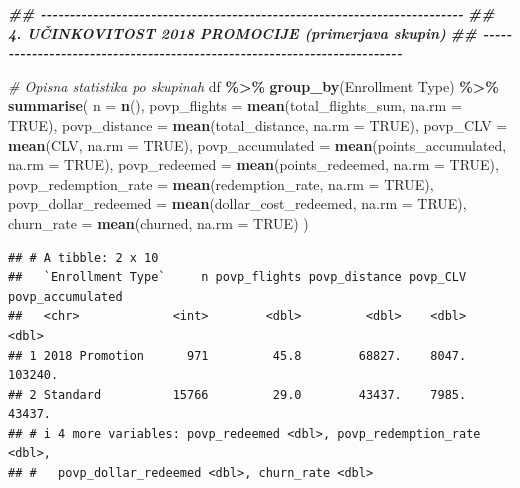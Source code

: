 \documentclass[
]{article}
\newenvironment{Shaded}{\begin{snugshade}}{\end{snugshade}}
\newcommand{\AttributeTok}[1]{\textcolor[rgb]{0.13,0.29,0.53}{#1}}
\newcommand{\CommentTok}[1]{\textcolor[rgb]{0.56,0.35,0.01}{\textit{#1}}}
\newcommand{\ConstantTok}[1]{\textcolor[rgb]{0.56,0.35,0.01}{#1}}
\newcommand{\DocumentationTok}[1]{\textcolor[rgb]{0.56,0.35,0.01}{\textbf{\textit{#1}}}}
\newcommand{\FunctionTok}[1]{\textcolor[rgb]{0.13,0.29,0.53}{\textbf{#1}}}
\newcommand{\NormalTok}[1]{#1}
\newcommand{\SpecialCharTok}[1]{\textcolor[rgb]{0.81,0.36,0.00}{\textbf{#1}}}
\newcommand{\StringTok}[1]{\textcolor[rgb]{0.31,0.60,0.02}{#1}}
\begin{document}
\begin{Shaded}
\begin{Highlighting}[]
\DocumentationTok{\#\# {-}{-}{-}{-}{-}{-}{-}{-}{-}{-}{-}{-}{-}{-}{-}{-}{-}{-}{-}{-}{-}{-}{-}{-}{-}{-}{-}{-}{-}{-}{-}{-}{-}{-}{-}{-}{-}{-}{-}{-}{-}{-}{-}{-}{-}{-}{-}{-}{-}{-}{-}{-}{-}{-}{-}{-}{-}{-}{-}{-}{-}{-}{-}{-}{-}{-}{-}{-}{-}{-}{-}{-}{-}}
\DocumentationTok{\#\# 4. UČINKOVITOST 2018 PROMOCIJE (primerjava skupin)}
\DocumentationTok{\#\# {-}{-}{-}{-}{-}{-}{-}{-}{-}{-}{-}{-}{-}{-}{-}{-}{-}{-}{-}{-}{-}{-}{-}{-}{-}{-}{-}{-}{-}{-}{-}{-}{-}{-}{-}{-}{-}{-}{-}{-}{-}{-}{-}{-}{-}{-}{-}{-}{-}{-}{-}{-}{-}{-}{-}{-}{-}{-}{-}{-}{-}{-}{-}{-}{-}{-}{-}{-}{-}{-}{-}{-}{-}}

\CommentTok{\# Opisna statistika po skupinah}
\NormalTok{df }\SpecialCharTok{\%\textgreater{}\%}
  \FunctionTok{group\_by}\NormalTok{(}\StringTok{\textasciigrave{}}\AttributeTok{Enrollment Type}\StringTok{\textasciigrave{}}\NormalTok{) }\SpecialCharTok{\%\textgreater{}\%}
  \FunctionTok{summarise}\NormalTok{(}
    \AttributeTok{n =} \FunctionTok{n}\NormalTok{(),}
    \AttributeTok{povp\_flights   =} \FunctionTok{mean}\NormalTok{(total\_flights\_sum, }\AttributeTok{na.rm =} \ConstantTok{TRUE}\NormalTok{),}
    \AttributeTok{povp\_distance  =} \FunctionTok{mean}\NormalTok{(total\_distance, }\AttributeTok{na.rm =} \ConstantTok{TRUE}\NormalTok{),}
    \AttributeTok{povp\_CLV       =} \FunctionTok{mean}\NormalTok{(CLV, }\AttributeTok{na.rm =} \ConstantTok{TRUE}\NormalTok{),}
    \AttributeTok{povp\_accumulated =} \FunctionTok{mean}\NormalTok{(points\_accumulated, }\AttributeTok{na.rm =} \ConstantTok{TRUE}\NormalTok{),}
    \AttributeTok{povp\_redeemed     =} \FunctionTok{mean}\NormalTok{(points\_redeemed, }\AttributeTok{na.rm =} \ConstantTok{TRUE}\NormalTok{),}
    \AttributeTok{povp\_redemption\_rate =} \FunctionTok{mean}\NormalTok{(redemption\_rate, }\AttributeTok{na.rm =} \ConstantTok{TRUE}\NormalTok{),}
    \AttributeTok{povp\_dollar\_redeemed =} \FunctionTok{mean}\NormalTok{(dollar\_cost\_redeemed, }\AttributeTok{na.rm =} \ConstantTok{TRUE}\NormalTok{),}
    \AttributeTok{churn\_rate     =} \FunctionTok{mean}\NormalTok{(churned, }\AttributeTok{na.rm =} \ConstantTok{TRUE}\NormalTok{)}
\NormalTok{  )}
\end{Highlighting}
\end{Shaded}

\begin{verbatim}
## # A tibble: 2 x 10
##   `Enrollment Type`     n povp_flights povp_distance povp_CLV povp_accumulated
##   <chr>             <int>        <dbl>         <dbl>    <dbl>            <dbl>
## 1 2018 Promotion      971         45.8        68827.    8047.          103240.
## 2 Standard          15766         29.0        43437.    7985.           43437.
## # i 4 more variables: povp_redeemed <dbl>, povp_redemption_rate <dbl>,
## #   povp_dollar_redeemed <dbl>, churn_rate <dbl>
\end{verbatim}
\end{document}
